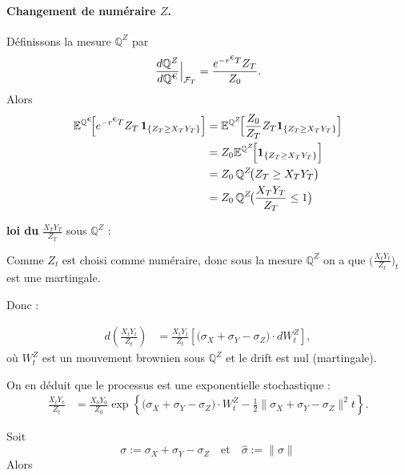 \paragraph{Changement de numéraire $Z$.}
Définissons la mesure $\mathbb{Q}^{Z}$ par
\[
\frac{d\mathbb{Q}^{Z}}{d\mathbb{Q}^{\EUR}}\Big|_{\mathcal{F}_T}
=\frac{e^{-r^{\EUR}T}Z_T}{Z_0}.
\]
Alors
\begin{align*}
\mathbb{E}^{\mathbb{Q}^{\EUR}}\!\Big[e^{-r^{\EUR}T} Z_T\,\mathbf{1}_{\{Z_T\ge X_TY_T\}}\Big] 
&= \mathbb{E}^{\mathbb{Q}^Z}\!\Big[\frac{Z_0}{Z_T}Z_T \mathbf{1}_{\{Z_T\ge X_TY_T\}}\Big] \\
&= Z_0\mathbb{E}^{\mathbb{Q}^Z}\!\Big[\mathbf{1}_{\{Z_T\ge X_TY_T\}}\Big] \\
&= Z_0\,\mathbb{Q}^{Z}\!\big(Z_T\ge X_TY_T\big) \\
&= Z_0\,\mathbb{Q}^{Z}\!\big( \frac{X_TY_T}{Z_T} \le 1 \big) \\
\end{align*}

\textbf{loi du} $\frac{X_TY_T}{Z_T}$ sous $\mathbb{Q}^Z$ :



Comme $Z_t$ est choisi comme numéraire, donc sous la  mesure $\mathbb{Q}^Z$ on  a que  $\big(\frac{X_t Y_t}{Z_t} \big)_t$ est une martingale.

Donc : 

\begin{align*}
d\!\left( \frac{X_t Y_t}{Z_t} \right)
&= \frac{X_t Y_t}{Z_t}
   \left[ \bigl(\sigma_X + \sigma_Y - \sigma_Z \bigr)\cdot dW_t^{Z} \right],
\end{align*}
où $W_t^{Z}$ est un mouvement brownien sous $\mathbb{Q}^Z$
et le drift est nul (martingale).

On en déduit que le processus est une exponentielle stochastique :
\begin{align*}
\frac{X_t Y_t}{Z_t}
&= \frac{X_0 Y_0}{Z_0}
   \exp\!\left\{
      \bigl(\sigma_X + \sigma_Y - \sigma_Z \bigr)\cdot W_t^{Z}
      - \tfrac12
        \bigl\|\sigma_X + \sigma_Y - \sigma_Z\bigr\|^2 t
   \right\}.
\end{align*}

Soit 
\[
\sigma := \sigma_X + \sigma_Y - \sigma_Z
\quad\text{et}\quad
\hat{\sigma} := \|\sigma\|
\]
Alors



